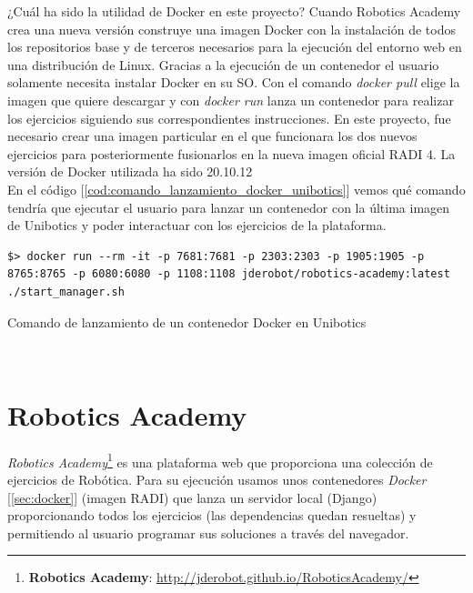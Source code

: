 ¿Cuál ha sido la utilidad de Docker en este proyecto? Cuando Robotics Academy crea una nueva versión construye una imagen Docker con la instalación de todos los repositorios base y de terceros necesarios para la ejecución del entorno web en una distribución de Linux. Gracias a la ejecución de un contenedor el usuario solamente necesita instalar Docker en su SO. Con el comando \textit{docker pull} elige la imagen que quiere descargar y con \textit{docker run} lanza un contenedor para realizar los ejercicios siguiendo sus correspondientes instrucciones. En este proyecto, fue necesario crear una imagen particular en el que funcionara los dos nuevos ejercicios para posteriormente fusionarlos en la nueva imagen oficial RADI 4. La versión de Docker utilizada ha sido 20.10.12\\

En el código [\ref{cod:comando_lanzamiento_docker_unibotics}] vemos qué comando tendría que ejecutar el usuario para lanzar un contenedor con la última imagen de Unibotics y poder interactuar con los ejercicios de la plataforma.\\

\begin{code}[H]
\begin{lstlisting}
$> docker run --rm -it -p 7681:7681 -p 2303:2303 -p 1905:1905 -p 8765:8765 -p 6080:6080 -p 1108:1108 jderobot/robotics-academy:latest ./start_manager.sh
\end{lstlisting}
\caption{Comando de lanzamiento de un contenedor Docker en Unibotics}
\label{cod:comando_lanzamiento_docker_unibotics}
\end{code}\





\section{Robotics Academy}
\label{sec:infraestructura_robotics_academy}

\textit{Robotics Academy}\footnote{\textbf{Robotics Academy}: \url{http://jderobot.github.io/RoboticsAcademy/}} es una plataforma web que proporciona una colección de ejercicios de Robótica. Para su ejecución usamos unos contenedores \textit{Docker} [\ref{sec:docker}]  (imagen RADI) que lanza un servidor local (Django) proporcionando todos los ejercicios (las dependencias quedan resueltas) y permitiendo al usuario programar sus soluciones a través del navegador.\\

